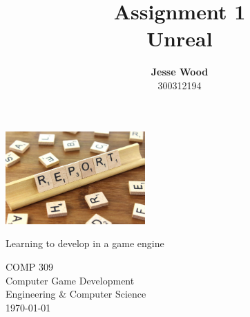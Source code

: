 \documentclass[12pt]{article}
\title{
  \Huge \textbf{Assignment 1} \\
  \vspace{0.5cm}
  \LARGE Unreal
}
\author{
  \textbf{Jesse Wood} \\
  300312194
}
\begin{document}
\begin{titlepage}
 \begin{center}
  \vspace*{1cm}

  \thetitle

  \vspace{0.8cm}

  \theauthor

  \vspace{1.0cm}

  \includegraphics[width=0.4\textwidth]{template}

  \vfill

  \Large
  Learning to develop in a game engine

  \vspace{1.0cm}

  \Large
  COMP 309 \\
  Computer Game Development \\
  Engineering \& Computer Science \\
  \today

 \end{center}
\end{titlepage}
\end{document}
